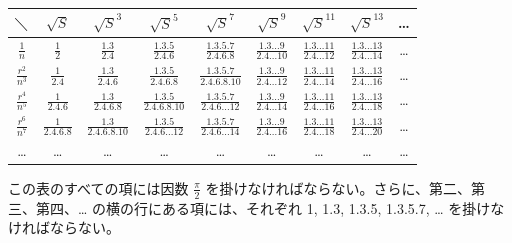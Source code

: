 \documentclass[11pt]{article}
\begin{document}
\begin{center}
\renewcommand{\arraystretch}{1.8}
\begin{tabular}{|c||c|c|c|c|c|c|c|c|}
\hline
$\diagdown$ & $\sqrt{S}$ & $\sqrt{S}^{3}$ & $\sqrt{S}^{5}$ & $\sqrt{S}^{7}$ & $\sqrt{S}^{9}$ & $\sqrt{S}^{11}$ & $\sqrt{S}^{13}$ & \dots \\
\hline\hline
$\frac{1}{n}$ & $\frac{1}{2}$ & $\frac{1.3}{2.4}$ & $\frac{1.3.5}{2.4.6}$ & $\frac{1.3.5.7}{2.4.6.8}$ & $\frac{1.3\ldots 9}{2.4\ldots 10}$ & $\frac{1.3\ldots 11}{2.4\ldots 12}$ & $\frac{1.3\ldots 13}{2.4\ldots 14}$ & \dots \\
\hline
$\frac{r^2}{n^3}$ & $\frac{1}{2.4}$ & $\frac{1.3}{2.4.6}$ & $\frac{1.3.5}{2.4.6.8}$ & $\frac{1.3.5.7}{2.4.6.8.10}$ & $\frac{1.3\ldots 9}{2.4\ldots 12}$ & $\frac{1.3\ldots 11}{2.4\ldots 14}$ & $\frac{1.3\ldots 13}{2.4\ldots 16}$ & \dots \\
\hline
$\frac{r^4}{n^5}$ & $\frac{1}{2.4.6}$ & $\frac{1.3}{2.4.6.8}$ & $\frac{1.3.5}{2.4.6.8.10}$ & $\frac{1.3.5.7}{2.4.6\ldots 12}$ & $\frac{1.3\ldots 9}{2.4\ldots 14}$ & $\frac{1.3\ldots 11}{2.4\ldots 16}$ & $\frac{1.3\ldots 13}{2.4\ldots 18}$ & \dots \\
\hline
$\frac{r^6}{n^7}$ & $\frac{1}{2.4.6.8}$ & $\frac{1.3}{2.4.6.8.10}$ & $\frac{1.3.5}{2.4.6\ldots 12}$ & $\frac{1.3.5.7}{2.4.6\ldots 14}$ & $\frac{1.3\ldots 9}{2.4\ldots 16}$ & $\frac{1.3\ldots 11}{2.4\ldots 18}$ & $\frac{1.3\ldots 13}{2.4\ldots 20}$ & \dots \\
\hline
\dots & \dots & \dots & \dots & \dots & \dots & \dots & \dots & \dots \\
\hline
\end{tabular}
\end{center}

この表のすべての項には因数 $\frac{\pi}{2}$ を掛けなければならない。さらに、第二、第三、第四、\dots{} の横の行にある項には、それぞれ 1, 1.3, 1.3.5, 1.3.5.7, \dots{} を掛けなければならない。
\end{document}
